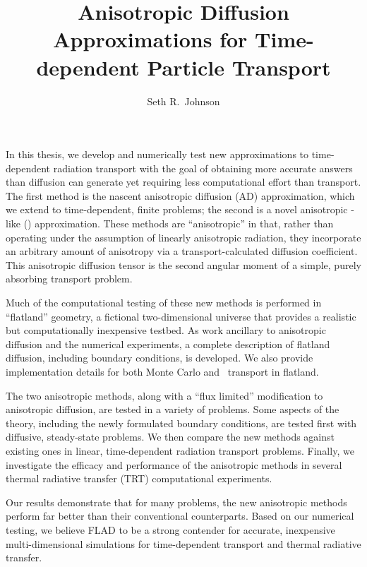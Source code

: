 \documentclass{umthesis}
\author{Seth R.~Johnson}
\title{Anisotropic Diffusion Approximations for Time-dependent Particle
Transport}
\begin{document}
\begin{finalabstract}

In this thesis, we develop and numerically test new approximations to
time-dependent radiation transport with the goal of obtaining more accurate
answers than diffusion can generate yet requiring less computational effort
than transport.
The first method is the nascent anisotropic diffusion (AD)
approximation, which we extend to time-dependent, finite problems; the
second is a novel anisotropic \Pone-like (\APone) approximation. These methods
are ``anisotropic'' in that, rather than operating under the assumption of
linearly anisotropic radiation, they incorporate an arbitrary amount of
anisotropy via a transport-calculated diffusion coefficient. This anisotropic
diffusion tensor is the second angular moment of a simple, purely
absorbing transport problem.

Much of the computational testing of these new methods is performed in
``flatland'' geometry, a fictional two-dimensional universe that provides a
realistic but computationally inexpensive testbed. As work ancillary to
anisotropic
diffusion and the numerical experiments, a complete description
of flatland diffusion, including boundary conditions, is developed. We also
provide implementation details for both Monte Carlo and \SN\ transport in
flatland.

The two anisotropic methods, along with a ``flux limited'' modification to
anisotropic diffusion, are tested in a variety of problems. Some aspects of the
theory, including the newly formulated boundary conditions, are tested first with
diffusive, steady-state problems. We then compare the new methods against
existing ones in linear, time-dependent radiation transport problems. Finally,
we
investigate the efficacy and performance of the anisotropic methods in
several thermal radiative transfer (TRT) computational experiments.

Our results demonstrate that for many problems, the new anisotropic
methods perform far better than their conventional counterparts.
Based on our numerical testing, we believe FLAD to be a strong contender for
accurate, inexpensive multi-dimensional simulations for time-dependent
transport and thermal radiative transfer.
\end{finalabstract}

\end{document}
